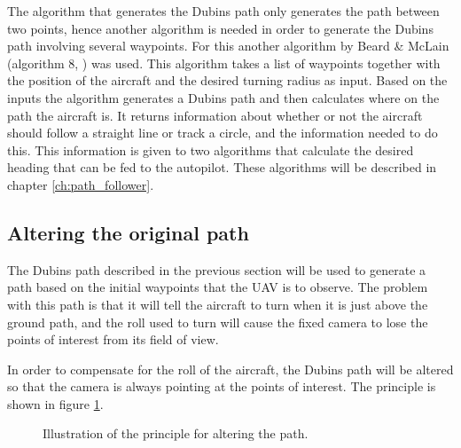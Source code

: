 The algorithm that generates the Dubins path only generates the path between two points, hence another algorithm is needed in order to generate the Dubins path involving several waypoints. For this another algorithm by Beard \& McLain (algorithm 8, \cite{suaBEARD}) was used. This algorithm takes a list of waypoints together with the position of the aircraft and the desired turning radius as input. Based on the inputs the algorithm generates a Dubins path and then calculates where on the path the aircraft is. It returns information about whether or not the aircraft should follow a straight line or track a circle, and the information needed to do this. This information is given to two algorithms that calculate the desired heading that can be fed to the autopilot. These algorithms will be described in chapter \ref{ch:path_follower}.


\subsection{Altering the original path}

The Dubins path described in the previous section will be used to generate a path based on the initial waypoints that the UAV is to observe. The problem with this path is that it will tell the aircraft to turn when it is just above the ground path, and the roll used to turn will cause the fixed camera to lose the points of interest from its field of view. 

In order to compensate for the roll of the aircraft, the Dubins path will be altered so that the camera is always pointing at the points of interest. The principle is shown in figure \ref{fig:altered_path}. 

\begin{figure}[]
    \centering
    \caption{Illustration of the principle for altering the path.}
	\label{fig:altered_path}
\end{figure}

